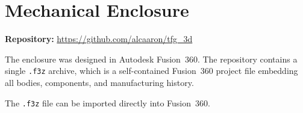 \documentclass[english,bachelor]{tfgitic}[2026/01/22]
\begin{document}
\section{Mechanical Enclosure}
\label{sec:repo_3d}

\noindent\textbf{Repository:}
\url{https://github.com/alcaaron/tfg_3d}

\medskip
The enclosure was designed in Autodesk Fusion~360. The repository contains a
single \texttt{.f3z} archive, which is a self-contained Fusion~360 project
file embedding all bodies, components, and manufacturing history.

{\small
{}
}

\noindent The \texttt{.f3z} file can be imported directly into Fusion~360.


\end{document}

